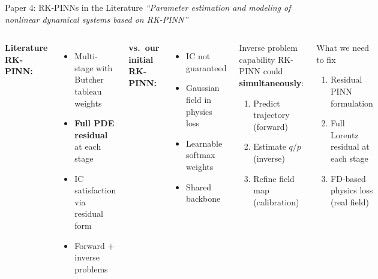 \documentclass[aspectratio=169, 11pt]{beamer}
\begin{document}
\begin{frame}{Paper 4: RK-PINNs in the Literature}
  \textit{``Parameter estimation and modeling of nonlinear dynamical systems based on RK-PINN''}

  \begin{columns}[T]
    \textbf{Literature RK-PINN:}
    \begin{itemize}\setlength{\itemsep}{1pt}
      \item Multi-stage with Butcher tableau weights
      \item \textbf{Full PDE residual} at each stage
      \item IC satisfaction via residual form
      \item Forward + inverse problems
    \end{itemize}

    \smallskip
    \textbf{vs.\ our initial RK-PINN:}
    \begin{itemize}\setlength{\itemsep}{1pt}
      \item[\textcolor{rk4red}{\ding{55}}] IC not guaranteed
      \item[\textcolor{rk4red}{\ding{55}}] Gaussian field in physics loss
      \item[\textcolor{nngreen}{\ding{51}}] Learnable softmax weights
      \item[\textcolor{nngreen}{\ding{51}}] Shared backbone
    \end{itemize}

    \begin{alertblock}{Inverse problem capability}
      RK-PINN could \textbf{simultaneously}:
      \begin{enumerate}\setlength{\itemsep}{1pt}
        \item Predict trajectory (forward)
        \item Estimate $q/p$ (inverse)
        \item Refine field map (calibration)
      \end{enumerate}
    \end{alertblock}

    \begin{block}{What we need to fix}
      \begin{enumerate}\setlength{\itemsep}{1pt}
        \item Residual PINN formulation
        \item Full Lorentz residual at each stage
        \item FD-based physics loss (real field)
      \end{enumerate}
    \end{block}
  \end{columns}
\end{frame}
\end{document}
